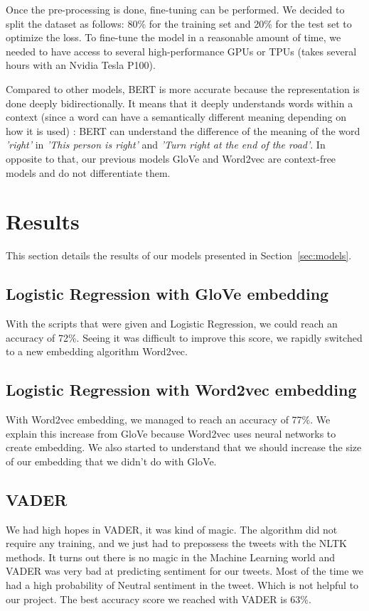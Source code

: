 \documentclass[letterpaper, 10 pt, conference]{ieeeconf}  %
\begin{document}
Once the pre-processing is done, fine-tuning can be performed. We decided to split the dataset as follows: 80\% for the training set and 20\% for the test set to optimize the loss. To fine-tune the model in a reasonable amount of time, we needed to have access to several high-performance GPUs or TPUs (takes several hours with an Nvidia Tesla P100).

Compared to other models, BERT is more accurate because the representation is done deeply bidirectionally. It means that it deeply understands words within a context (since a word can have a semantically different meaning depending on how it is used) \cite{BERT_paper}: BERT can understand the difference of the meaning of the word \textit{'right'} in \textit{'This person is right'} and \textit{'Turn right at the end of the road'}. In opposite to that, our previous models GloVe and Word2vec are context-free models and do not differentiate them. 

\section{Results}
\label{sec:results}

This section details the results of our models presented in Section~\ref{sec:models}.

\subsection{Logistic Regression with GloVe embedding} 

With the scripts that were given and Logistic Regression, we could reach an accuracy of 72\%. Seeing it was difficult to improve this score, we rapidly switched to a new embedding algorithm Word2vec.
  
\subsection{Logistic Regression with Word2vec embedding} 
  
With Word2vec embedding, we managed to reach an accuracy of 77\%. We explain this increase from GloVe because Word2vec uses neural networks to create embedding. We also started to understand that we should increase the size of our embedding that we didn't do with GloVe.

\subsection{VADER} 
We had high hopes in VADER, it was kind of magic. The algorithm did not require any training, and we just had to prepossess the tweets with the NLTK methods. It turns out there is no magic in the Machine Learning world and VADER was very bad at predicting sentiment for our tweets. Most of the time we had a high probability of Neutral sentiment in the tweet. Which is not helpful to our project. The best accuracy score we reached with VADER is 63\%. 
\end{document}
